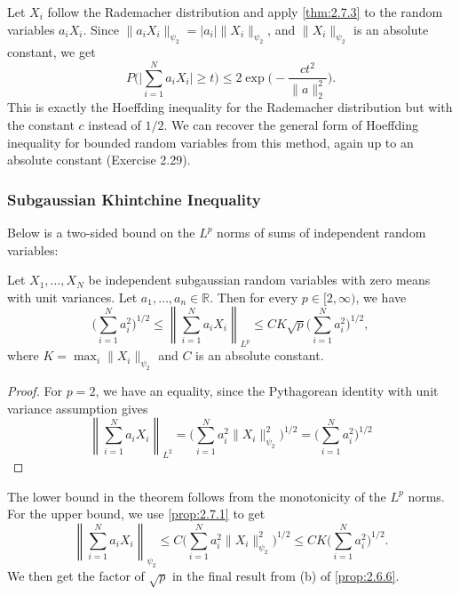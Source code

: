 \begin{example}
\label{ex:2.7.4}
Let $X_i$ follow the Rademacher distribution and apply \cref{thm:2.7.3} to the random variables 
$a_i X_i$. Since $\lVert a_i X_i \rVert_{\psi_2} = |a_i| \lVert X_i \rVert_{\psi_2}$, 
and $\lVert X_i \rVert_{\psi_2}$ is an absolute 
constant, we get 
\[  P \biggl( \bigg| \sum_{i = 1}^{N} a_iX_i \bigg| \geq t \biggr) 
\leq 2\exp{\biggl( -\frac{ct^2}{\lVert a \rVert_2^2} \biggr)}. \]
This is exactly the Hoeffding inequality for the Rademacher distribution but with the constant $c$ instead 
of $1/2$. We can recover the general form of Hoeffding inequality for bounded random variables from this 
method, again up to an absolute constant (Exercise 2.29).
\end{example}


\subsubsection{Subgaussian Khintchine Inequality}
Below is a two-sided bound on the $L^p$ norms of sums of independent random variables:
\begin{theorem}
\label{thm:2.7.5}
Let $X_1, \dots, X_N$ be independent subgaussian random variables with zero means with unit variances. 
Let $a_1, \dots, a_n \in \mathbb{R}$. Then for every $p \in [2, \infty)$, we have 
\[ \biggl( \sum_{i = 1}^{N} a_i^2 \biggr)^{1/2} \leq 
\left\lVert \sum_{i = 1}^{N} a_i X_i \right\rVert_{L^p} \leq 
CK \sqrt{p}\biggl( \sum_{i = 1}^{N} a_i^2 \biggr)^{1/2}, \]
where $K = \max_{i} \lVert X_i \rVert_{\psi_2}$ and $C$ is an absolute constant.
\end{theorem}

\begin{proof}
For $p = 2$, we have an equality, since the Pythagorean identity with unit variance assumption gives 
\[ \left\lVert \sum_{i = 1}^{N} a_i X_i \right\rVert_{L^2} 
= \biggl( \sum_{i = 1}^{N} a_i^2 \lVert X_i \rVert_{\psi_2}^2 \biggr)^{1/2} 
= \biggl( \sum_{i = 1}^{N} a_i^2 \biggr)^{1/2} \]
\end{proof}
The lower bound in the theorem follows from the monotonicity of the $L^p$ norms. For the upper bound, 
we use \cref{prop:2.7.1} to get 
\[ \left\lVert \sum_{i = 1}^{N} a_i X_i \right\rVert_{\psi_2} 
\leq C \biggl( \sum_{i = 1}^{N} a_i^2 \lVert X_i \rVert_{\psi_2}^2 \biggr)^{1/2} 
\leq CK \biggl( \sum_{i = 1}^{N} a_i^2 \biggr)^{1/2}. \]
We then get the factor of $\sqrt{p}$ in the final result from (b) of \cref{prop:2.6.6}.


